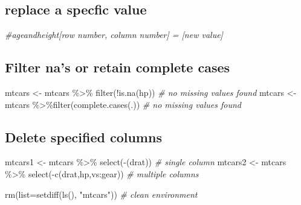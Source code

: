\documentclass[
]{article}
\newenvironment{Shaded}{\begin{snugshade}}{\end{snugshade}}
\newcommand{\AttributeTok}[1]{\textcolor[rgb]{0.77,0.63,0.00}{#1}}
\newcommand{\CommentTok}[1]{\textcolor[rgb]{0.56,0.35,0.01}{\textit{#1}}}
\newcommand{\FunctionTok}[1]{\textcolor[rgb]{0.00,0.00,0.00}{#1}}
\newcommand{\NormalTok}[1]{#1}
\newcommand{\OtherTok}[1]{\textcolor[rgb]{0.56,0.35,0.01}{#1}}
\newcommand{\SpecialCharTok}[1]{\textcolor[rgb]{0.00,0.00,0.00}{#1}}
\newcommand{\StringTok}[1]{\textcolor[rgb]{0.31,0.60,0.02}{#1}}
\begin{document}
\hypertarget{replace-a-specfic-value}{%
\subsection{replace a specfic value}\label{replace-a-specfic-value}}

\begin{Shaded}
\begin{Highlighting}[]
\CommentTok{\#ageandheight[row number, column number] = [new value]}
\end{Highlighting}
\end{Shaded}

\hypertarget{filter-nas-or-retain-complete-cases}{%
\subsection{Filter na's or retain complete cases}\label{filter-nas-or-retain-complete-cases}}

\begin{Shaded}
\begin{Highlighting}[]
\NormalTok{mtcars }\OtherTok{\textless{}{-}}\NormalTok{ mtcars }\SpecialCharTok{\%\textgreater{}\%} \FunctionTok{filter}\NormalTok{(}\SpecialCharTok{!}\FunctionTok{is.na}\NormalTok{(hp)) }\CommentTok{\# no missing values found}
\NormalTok{mtcars }\OtherTok{\textless{}{-}}\NormalTok{ mtcars }\SpecialCharTok{\%\textgreater{}\%}\FunctionTok{filter}\NormalTok{(}\FunctionTok{complete.cases}\NormalTok{(.)) }\CommentTok{\# no missing values found}
\end{Highlighting}
\end{Shaded}

\hypertarget{delete-specified-columns}{%
\subsection{Delete specified columns}\label{delete-specified-columns}}

\begin{Shaded}
\begin{Highlighting}[]
\NormalTok{mtcars1 }\OtherTok{\textless{}{-}}\NormalTok{ mtcars }\SpecialCharTok{\%\textgreater{}\%} \FunctionTok{select}\NormalTok{(}\SpecialCharTok{{-}}\NormalTok{(drat)) }\CommentTok{\# single column}
\NormalTok{mtcars2 }\OtherTok{\textless{}{-}}\NormalTok{ mtcars }\SpecialCharTok{\%\textgreater{}\%} \FunctionTok{select}\NormalTok{(}\SpecialCharTok{{-}}\FunctionTok{c}\NormalTok{(drat,hp,vs}\SpecialCharTok{:}\NormalTok{gear)) }\CommentTok{\# multiple columns}

\FunctionTok{rm}\NormalTok{(}\AttributeTok{list=}\FunctionTok{setdiff}\NormalTok{(}\FunctionTok{ls}\NormalTok{(), }\StringTok{"mtcars"}\NormalTok{)) }\CommentTok{\# clean environment}
\end{Highlighting}
\end{Shaded}
\end{document}

